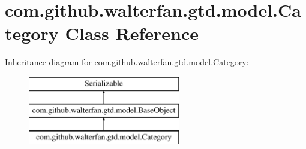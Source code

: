 \hypertarget{classcom_1_1github_1_1walterfan_1_1gtd_1_1model_1_1Category}{\section{com.\-github.\-walterfan.\-gtd.\-model.\-Category Class Reference}
\label{classcom_1_1github_1_1walterfan_1_1gtd_1_1model_1_1Category}
}
Inheritance diagram for com.\-github.\-walterfan.\-gtd.\-model.\-Category\-:\begin{figure}[H]
\begin{center}
\leavevmode
\includegraphics[height=3.000000cm]{classcom_1_1github_1_1walterfan_1_1gtd_1_1model_1_1Category}
\end{center}
\end{figure}

